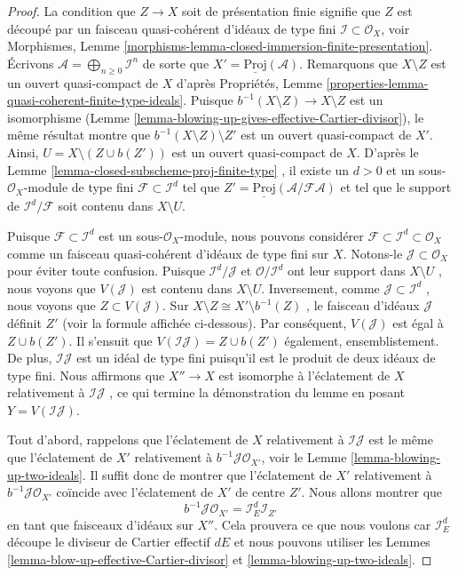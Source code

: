 \begin{proof}
La condition que  $Z \to X$  soit de présentation finie signifie que  $Z$ 
est découpé par un faisceau quasi-cohérent d'idéaux de type fini  $\mathcal{I} \subset \mathcal{O}_X$,
voir Morphismes, Lemme  \ref{morphisms-lemma-closed-immersion-finite-presentation}. Écrivons  $\mathcal{A} = \bigoplus_{n \geq 0} \mathcal{I}^n$  de sorte que
 $X' = \underline{\text{Proj}}(\mathcal{A})$. Remarquons que  $X \setminus Z$  est un ouvert quasi-compact de
 $X$  d'après Propriétés, Lemme  \ref{properties-lemma-quasi-coherent-finite-type-ideals}. Puisque  $b^{-1}(X \setminus Z) \to X \setminus Z$  est un
isomorphisme (Lemme  \ref{lemma-blowing-up-gives-effective-Cartier-divisor}), le même résultat montre que  $b^{-1}(X \setminus Z) \setminus Z'$  est un
ouvert quasi-compact de  $X'$. Ainsi,  $U = X \setminus (Z \cup b(Z'))$  est un ouvert
quasi-compact de  $X$. D'après le Lemme  \ref{lemma-closed-subscheme-proj-finite-type} , il existe un
 $d > 0$  et un sous-$\mathcal{O}_X$-module de type fini  $\mathcal{F} \subset \mathcal{I}^d$  tel que
 $Z' = \underline{\text{Proj}}(\mathcal{A}/\mathcal{F}\mathcal{A})$  et tel que le support de  $\mathcal{I}^d/\mathcal{F}$  soit contenu dans  $X \setminus U$.

\medskip\noindent
Puisque  $\mathcal{F} \subset \mathcal{I}^d$  est un sous-$\mathcal{O}_X$-module, nous pouvons considérer
 $\mathcal{F} \subset \mathcal{I}^d \subset \mathcal{O}_X$  comme un faisceau quasi-cohérent d'idéaux de type fini sur
 $X$. Notons-le  $\mathcal{J} \subset \mathcal{O}_X$  pour éviter toute confusion. Puisque
 $\mathcal{I}^d / \mathcal{J}$  et  $\mathcal{O}/\mathcal{I}^d$  ont leur support dans  $X \setminus U$ , nous voyons que
 $V(\mathcal{J})$  est contenu dans  $X \setminus U$. Inversement, comme  $\mathcal{J} \subset \mathcal{I}^d$ ,
nous voyons que  $Z \subset V(\mathcal{J})$. Sur  $X \setminus Z \cong X' \setminus b^{-1}(Z)$ , le faisceau d'idéaux  $\mathcal{J}$ 
définit  $Z'$  (voir la formule affichée ci-dessous). Par conséquent,
 $V(\mathcal{J})$  est égal à  $Z \cup b(Z')$. Il s'ensuit que  $V(\mathcal{I}\mathcal{J}) = Z \cup b(Z')$  également,
ensemblistement. De plus,  $\mathcal{I}\mathcal{J}$  est un idéal de type fini puisqu'il
est le produit de deux idéaux de type fini. Nous affirmons que  $X'' \to X$  est isomorphe à
l'éclatement de  $X$  relativement à  $\mathcal{I}\mathcal{J}$ , ce qui termine la démonstration du
lemme en posant  $Y = V(\mathcal{I}\mathcal{J})$.

\medskip\noindent
Tout d'abord, rappelons que l'éclatement de  $X$  relativement à  $\mathcal{I}\mathcal{J}$  est le
même que l'éclatement de  $X'$  relativement à  $b^{-1}\mathcal{J} \mathcal{O}_{X'}$, voir le Lemme
 \ref{lemma-blowing-up-two-ideals}. Il suffit donc de montrer que l'éclatement de  $X'$  relativement à
 $b^{-1}\mathcal{J} \mathcal{O}_{X'}$  coïncide avec l'éclatement de  $X'$  de centre  $Z'$. Nous
allons montrer que
$$
b^{-1}\mathcal{J} \mathcal{O}_{X'} = \mathcal{I}_E^d \mathcal{I}_{Z'}
$$
en tant que faisceaux d'idéaux sur  $X''$. Cela prouvera ce que nous voulons
car  $\mathcal{I}_E^d$  découpe le diviseur de Cartier effectif  $dE$  et nous
pouvons utiliser les Lemmes  \ref{lemma-blow-up-effective-Cartier-divisor}  et  \ref{lemma-blowing-up-two-ideals}.


\end{proof}
